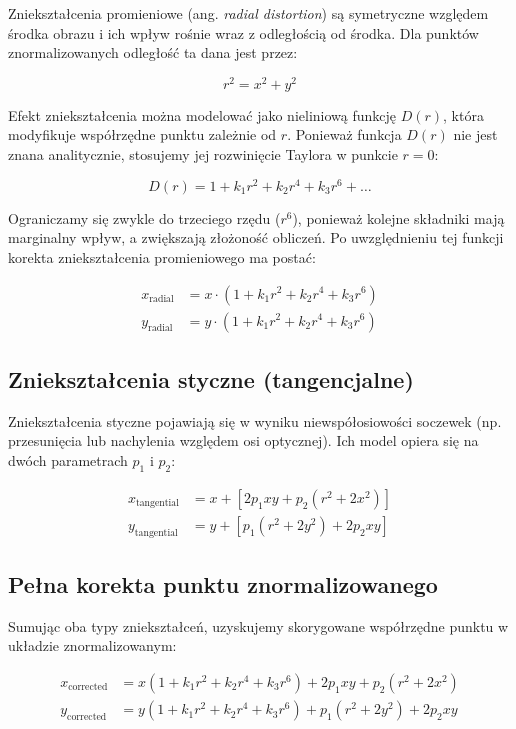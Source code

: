 \documentclass[magisterska]{pracadypl}
\begin{document}
Zniekształcenia promieniowe (ang. \emph{radial distortion}) są symetryczne względem środka obrazu i ich wpływ rośnie wraz z odległością od środka. Dla punktów znormalizowanych odległość ta dana jest przez:

\[
r^2 = x^2 + y^2
\]

Efekt zniekształcenia można modelować jako nieliniową funkcję \( D(r) \), która modyfikuje współrzędne punktu zależnie od \( r \). Ponieważ funkcja \( D(r) \) nie jest znana analitycznie, stosujemy jej rozwinięcie Taylora w punkcie \( r = 0 \):

\[
D(r) = 1 + k_1 r^2 + k_2 r^4 + k_3 r^6 + \ldots
\]

Ograniczamy się zwykle do trzeciego rzędu (\( r^6 \)), ponieważ kolejne składniki mają marginalny wpływ, a zwiększają złożoność obliczeń. Po uwzględnieniu tej funkcji korekta zniekształcenia promieniowego ma postać:

\begin{align*}
x_{\text{radial}} &= x \cdot \left(1 + k_1 r^2 + k_2 r^4 + k_3 r^6 \right) \\
y_{\text{radial}} &= y \cdot \left(1 + k_1 r^2 + k_2 r^4 + k_3 r^6 \right)
\end{align*}

\subsection*{Zniekształcenia styczne (tangencjalne)}

Zniekształcenia styczne pojawiają się w wyniku niewspółosiowości soczewek (np. przesunięcia lub nachylenia względem osi optycznej). Ich model opiera się na dwóch parametrach \( p_1 \) i \( p_2 \):

\begin{align*}
x_{\text{tangential}} &= x + \left[2p_1 x y + p_2 (r^2 + 2x^2)\right] \\
y_{\text{tangential}} &= y + \left[p_1 (r^2 + 2y^2) + 2p_2 x y\right]
\end{align*}

\subsection*{Pełna korekta punktu znormalizowanego}

Sumując oba typy zniekształceń, uzyskujemy skorygowane współrzędne punktu w układzie znormalizowanym:

\begin{align*}
x_{\text{corrected}} &= x(1 + k_1 r^2 + k_2 r^4 + k_3 r^6) + 2p_1 x y + p_2 (r^2 + 2x^2) \\
y_{\text{corrected}} &= y(1 + k_1 r^2 + k_2 r^4 + k_3 r^6) + p_1 (r^2 + 2y^2) + 2p_2 x y
\end{align*}
\end{document}
